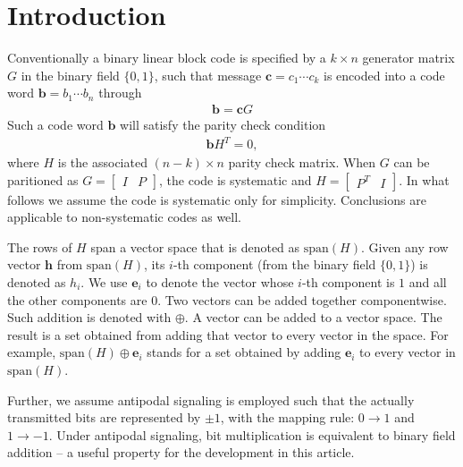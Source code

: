 \documentclass[12pt]{article}
\newcommand{\vect}[1]{\mathbf{#1}}
\begin{document}
\maketitle

\section{Introduction}
Conventionally a binary linear block code is specified by a $k\times n$ generator matrix $G$ in the binary field $\{0,1\}$, such that message $\vect{c}=c_1\cdots c_k$ is encoded into a code word $\vect{b} = b_1\cdots b_n$ through
\begin{align}
\vect{b} = \vect{c}G
\end{align}
Such a code word $\vect{b}$ will satisfy the parity check condition
\begin{align}
\vect{b}H^T=0,
\end{align}
where $H$ is the associated $(n-k)\times n$ parity check matrix. When $G$ can be paritioned as $G=\begin{bmatrix}I &P\end{bmatrix}$, the code is systematic and $H = \begin{bmatrix}P^T & I\end{bmatrix}$. In what follows we assume the code is systematic only for simplicity. Conclusions are applicable to non-systematic codes as well.

The rows of $H$ span a vector space that is denoted as $\mathrm{span}(H)$. Given any row vector $\vect{h}$ from $\mathrm{span}(H)$, its $i$-th component (from the binary field $\{0,1\}$) is denoted as $h_i$. We use $\vect{e}_i$ to denote the vector whose $i$-th component is $1$ and all the other components are $0$. Two vectors can be added together componentwise. Such addition is denoted with $\oplus$. A vector can be added to a vector space. The result is a set obtained from adding that vector to every vector in the space. For example, $\mathrm{span}(H)\oplus \vect{e}_i$ stands for a set obtained by adding $\vect{e}_i$ to every vector in $\mathrm{span}(H)$.

Further, we assume antipodal signaling is employed such that the actually transmitted bits are represented by $\pm 1$, with the mapping rule: $0\rightarrow 1$ and $1\rightarrow -1$. Under antipodal signaling, bit multiplication is equivalent to binary field addition -- a useful property for the development in this article.
\end{document}
